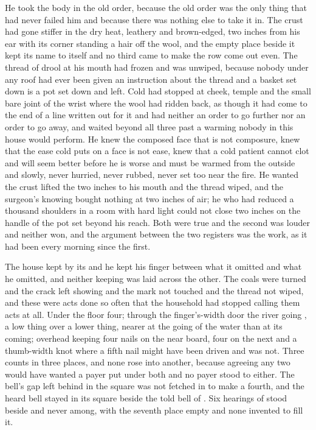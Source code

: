 He took the body in the old order, because the old order was the only thing that had never failed him and because there was nothing else to take it in. The crust had gone stiffer in the dry heat, leathery and brown-edged, two inches from his ear with its corner standing a hair off the wool, and the empty place beside it kept its name to itself and no third came to make the row come out even. The thread of drool at his mouth had frozen and was unwiped, because nobody under any roof had ever been given an instruction about the thread and a basket set down is a pot set down and left. Cold had stopped at cheek, temple and the small bare joint of the wrist where the wool had ridden back, as though it had come to the end of a line written out for it and had neither an order to go further nor an order to go away, and  waited beyond all three past a warming nobody in this house would perform. He knew the composed face that is not composure, knew that the ease cold puts on a face is not ease, knew that a cold patient cannot clot and will seem better before he is worse and must be warmed from the outside and slowly, never hurried, never rubbed, never set too near the fire. He wanted the crust lifted the two inches to his mouth and the thread wiped, and the surgeon's knowing bought nothing at two inches of air; he who had reduced a thousand shoulders in a room with hard light could not close two inches on the handle of the pot set beyond his reach. Both were true and the second was louder and neither won, and the argument between the two registers was the work, as it had been every morning since the first.

The house kept by its  and he kept his finger between what it omitted and what he omitted, and neither keeping was laid across the other. The coals were turned and the crack left showing and the mark not touched and the thread not wiped, and these were acts done so often that the household had stopped calling them acts at all. Under the floor four; through the finger's-width door the river going , a low thing over a lower thing, nearer at the going of the water than at its coming; overhead  keeping four nails on the near board, four on the next and a thumb-width knot where a fifth nail might have been driven and was not. Three counts in three places, and none rose into another, because agreeing any two would have wanted a payer put under both and no payer stood to either. The bell's gap left behind in the square was not fetched in to make a fourth, and the heard bell stayed in its square beside the told bell of . Six hearings of  stood beside and never among, with the seventh place empty and none invented to fill it.

